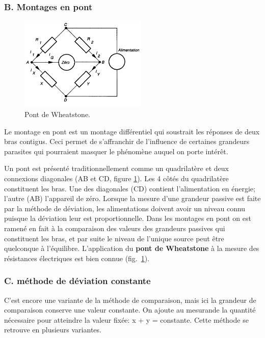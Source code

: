 \subsubsection{B. Montages en pont}

\begin{figure}
    \centering
    \includegraphics[width=6cm]{assets/figures/wheatstone.pdf}
    \caption{Pont de Wheatstone.}
    \label{fig:pont}
\end{figure}
Le montage en pont est un montage différentiel qui soustrait les réponses de deux bras contigus. Ceci permet de s'affranchir de l'influence de certaines grandeurs parasites qui pourraient masquer le phénomène auquel on porte intérêt.

Un pont est présenté traditionnellement comme un quadrilatère et deux connexions diagonales (AB et CD, figure \ref{fig:pont}). Les 4 côtés du quadrilatère constituent les bras. Une des diagonales (CD) contient l'alimentation en énergie; l'autre (AB) l'appareil de zéro. Lorsque la mesure d'une grandeur passive est faite par la méthode de déviation, les alimentations doivent avoir un niveau connu puisque la déviation leur est proportionnelle. Dans les montages en pont on est ramené en fait à la comparaison des valeurs des grandeurs passives qui constituent les bras, et par suite le niveau de l'unique source peut être quelconque à l'équilibre. L'application du \textbf{pont de Wheatstone} à la mesure des résistances électriques est bien connue (fig.~\ref{fig:pont}).

\subsubsection{C. méthode de déviation constante}

C'est encore une variante de la méthode de comparaison, mais ici la grandeur de comparaison conserve une valeur constante.  On ajoute au mesurande la quantité nécessaire pour atteindre la valeur fixée: x + y = constante. Cette méthode se retrouve en plusieurs variantes.

